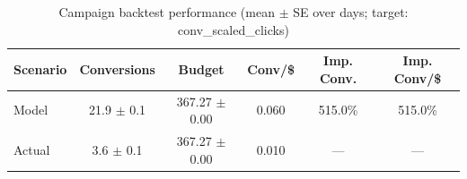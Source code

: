 \begin{table}[htbp]
\centering
\caption{Campaign backtest performance (mean $\pm$ SE over days; target: conv_scaled_clicks)}
\begin{tabular}{lccccc}
\toprule
Scenario & Conversions & Budget & Conv/\$ & Imp. Conv. & Imp. Conv/\$ \\
\midrule
Model & 21.9 $\pm$ 0.1 & 367.27 $\pm$ 0.00 & 0.060 & 515.0\% & 515.0\% \\
Actual & 3.6 $\pm$ 0.1 & 367.27 $\pm$ 0.00 & 0.010 & --- & --- \\
\bottomrule
\end{tabular}

\end{table}
